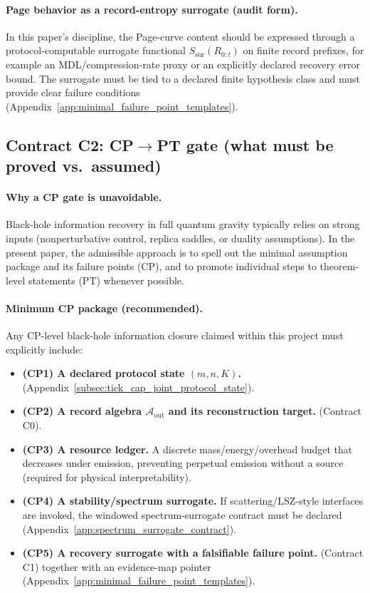 \paragraph{Page behavior as a record-entropy surrogate (audit form).}
\AuditTag In this paper's discipline, the Page-curve content should be expressed through a
protocol-computable surrogate functional $S_{\mathrm{sur}}(R_{0:t})$ on finite record prefixes,
for example an MDL/compression-rate proxy or an explicitly declared recovery error bound.
The surrogate must be tied to a declared finite hypothesis class and must provide
clear failure conditions (Appendix~\ref{app:minimal_failure_point_templates}).

\subsection{Contract C2: CP\texorpdfstring{$\to$}{->}PT gate (what must be proved vs.\ assumed)}
\label{subsec:bh_contract_cp_to_pt_gate}

\paragraph{Why a CP gate is unavoidable.}
\AuditTag Black-hole information recovery in full quantum gravity typically relies on strong inputs
(nonperturbative control, replica saddles, or duality assumptions).
In the present paper, the admissible approach is to spell out the minimal assumption package and its
failure points (CP), and to promote individual steps to theorem-level statements (PT) whenever possible.

\paragraph{Minimum CP package (recommended).}
\AuditTag Any CP-level black-hole information closure claimed within this project must explicitly include:
\begin{itemize}
\item \textbf{(CP1) A declared protocol state $(m,n,K)$.} (Appendix~\ref{subsec:tick_cap_joint_protocol_state}).
\item \textbf{(CP2) A record algebra $\mathcal{A}_{\mathrm{out}}$ and its reconstruction target.}
(Contract C0).
\item \textbf{(CP3) A resource ledger.} A discrete mass/energy/overhead budget that decreases under emission,
preventing perpetual emission without a source (required for physical interpretability).
\item \textbf{(CP4) A stability/spectrum surrogate.} If scattering/LSZ-style interfaces are invoked,
the windowed spectrum-surrogate contract must be declared (Appendix~\ref{app:spectrum_surrogate_contract}).
\item \textbf{(CP5) A recovery surrogate with a falsifiable failure point.} (Contract C1) together with an
evidence-map pointer (Appendix~\ref{app:minimal_failure_point_templates}).
\end{itemize}

